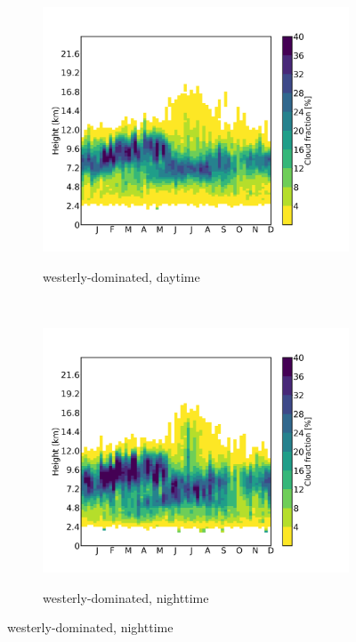 \documentclass[alpha-refs]{wiley-article}
\begin{document}
\begin{figure}[!htbp]
\begin{subfigure}[b]{0.5\textwidth}
    \end{subfigure}
    
        \bigskip
        
   \begin{subfigure}[b]{0.5\textwidth}
       \centering
        \caption{westerly-dominated, daytime}       
        \includegraphics[width=\textwidth]{cloudsat_cloudfract_seasonal_westerlymode_day.png}
        \label{fig:vertical_cloudfract5}

    \end{subfigure}%
    ~ 
    \begin{subfigure}[b]{0.5\textwidth}
        \centering
\caption{westerly-dominated, nighttime}        
        \includegraphics[width=\textwidth]{cloudsat_cloudfract_seasonal_westerlymode_night.png}
        \label{fig:vertical_cloudfract6}
    \end{subfigure}
    \label{fig:vertical_cloudfract}
    \end{figure}
\end{document}
